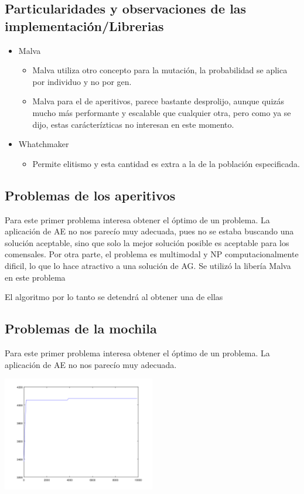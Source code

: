 \documentclass[9pt,conference]{IEEEtran}
\begin{document}
	\subsection{Particularidades y observaciones de las implementaci\'on/Librerias}
	\begin{itemize}
		\item Malva
		\begin{itemize}
			\item Malva utiliza otro concepto para la mutaci\'on, la probabilidad se aplica por individuo y no por gen.
			\item Malva para el de aperitivos, parece bastante desprolijo, aunque quiz\'as mucho m\'as performante y escalable que cualquier otra, pero como ya se dijo, estas car\'acter\'izticas no interesan en este momento.
		\end{itemize}

		\item Whatchmaker
		\begin{itemize}	
			\item Permite elitismo y esta cantidad es extra a la de la poblaci\'on especificada.
		\end{itemize}
	\end{itemize}


	\subsection{Problemas de los aperitivos}
	
	Para este primer problema interesa obtener el \'optimo de un problema. La aplicaci\'on de AE no nos parec\'io muy adecuada, pues no se estaba buscando una solución aceptable, sino que solo la mejor solución posible es aceptable para los comensales. Por otra parte, el problema es multimodal y NP computacionalmente dificil, lo que lo hace atractivo a una solución de AG.
	Se utilizó la libería Malva en este problema 

	El algoritmo por lo tanto se detendrá al obtener una de ellas

	\subsection{Problemas de la mochila}

	Para este primer problema interesa obtener el \'optimo de un problema. La aplicaci\'on de AE no nos parec\'io muy adecuada.

\includegraphics[width=0.5\textwidth]{images/graf_test_in.png}
\end{document}
